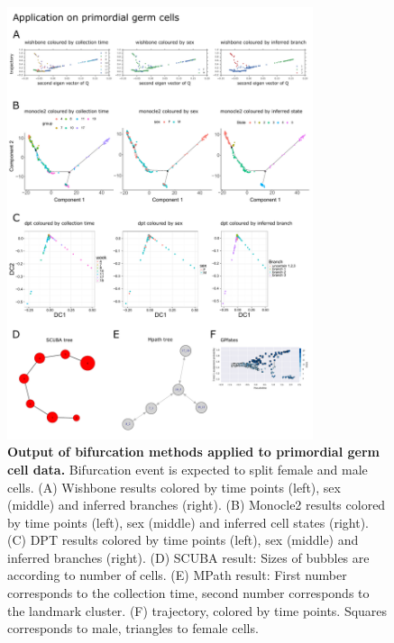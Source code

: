 \begin{figure}
    \centering
    \includegraphics[width=0.8\textwidth]{"results_pgc"}
    \caption[Output of bifurcation methods applied to primordial germ cell data]{\textbf{Output of bifurcation methods applied to primordial germ cell data.} Bifurcation event is expected to split female and male cells. (A) Wishbone results colored by time points (left), sex (middle) and inferred branches (right). (B) Monocle2 results colored by time points (left), sex (middle) and inferred cell states (right). (C) DPT results colored by time points (left), sex (middle) and inferred branches (right). (D) SCUBA result: Sizes of bubbles are according to number of cells. (E) MPath result: First number corresponds to the collection time, second number corresponds to the landmark cluster. (F)  trajectory, colored by time points. Squares corresponds to male, triangles to female cells.}
    \label{fig:res_pgc}
\end{figure}

